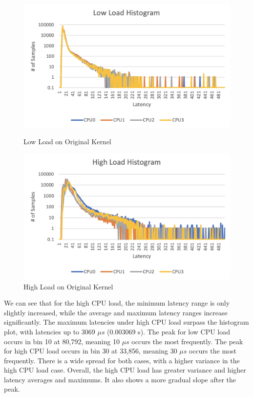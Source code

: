 \documentclass[a4paper,10pt]{article}
\begin{document}
\begin{figure}[H]
\centering
\begin{minipage}{0.5\textwidth}
  \centering
  \includegraphics[width=1\linewidth]{Images/original - low load hist.png}
  \caption{Low Load on Original Kernel}
  \label{Low Load on Original}
\end{minipage}%
\begin{minipage}{0.5\textwidth}
  \centering
  \includegraphics[width=1\linewidth]{Images/original - high load hist.png}
  \caption{High Load on Original Kernel}
  \label{High Load on Original}
\end{minipage}
\end{figure}

We can see that for the high CPU load, the minimum latency range is only slightly increased, while the average and maximum latency ranges increase significantly. The maximum latencies under high CPU load surpass the histogram plot, with latencies up to 3069 $\mu s$ (0.003069 s). The peak for low CPU load occurs in bin 10 at 80,792, meaning 10 $\mu s$ occurs the most frequently. The peak for high CPU load occurs in bin 30 at 33,856, meaning 30 $\mu s$ occurs the most frequently. There is a wide spread for both cases, with a higher variance in the high CPU load case. Overall, the high CPU load has greater variance and higher latency averages and maximums. It also shows a more gradual slope after the peak. 
\end{document}
